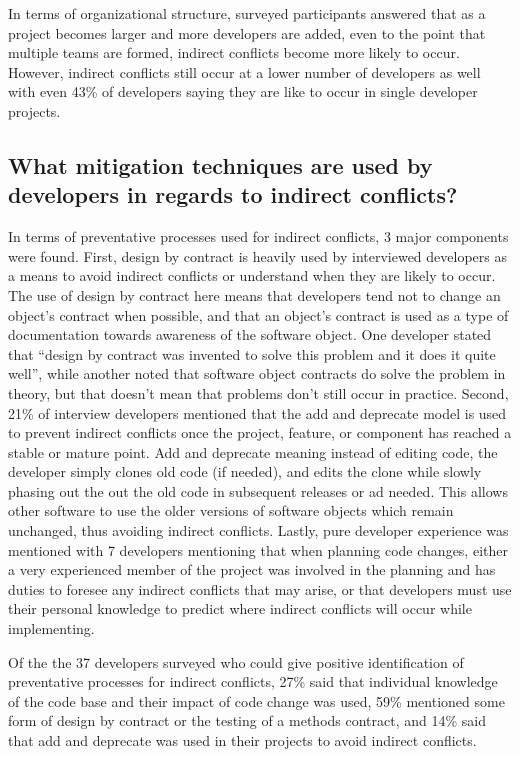\documentclass[conference]{IEEEtran}
\begin{document}
In terms of organizational structure, surveyed participants answered that as a project becomes larger and more 
developers are added, even to the point that multiple teams are formed, indirect conflicts become more likely to
occur. However, indirect conflicts still occur at a lower number of developers as well with even 43\% of developers
saying they are like to occur in single developer projects.

\subsection{What mitigation techniques are used by developers in regards to indirect conflicts?}

In terms of preventative processes used for indirect conflicts, 3 major components were found.
First, design by contract is heavily used by interviewed developers as a means to avoid indirect conflicts or understand
when they are likely to occur. The use of design by contract here means that developers tend not to change an object's
contract when possible, and that an object's contract is used as a type of documentation towards awareness of the 
software object. One developer stated that ``design by contract was invented to solve this problem and it does it 
quite well'', while another noted that software object contracts do solve the problem in theory, but that doesn't 
mean that problems don't still occur in practice.
Second, 21\% of interview developers mentioned that the add and deprecate 
model is used to prevent indirect conflicts once
the project, feature, or component has reached a stable or mature point.
Add and deprecate meaning instead of editing code, the developer simply clones old code (if needed), and edits the clone
while slowly phasing out the out the old code in subsequent releases or ad needed. This allows other software to 
use the older versions of software objects which remain unchanged, thus avoiding indirect conflicts.
Lastly, pure developer experience was mentioned with 7 developers mentioning that when planning code changes, 
either a very experienced member of the project was involved in the planning and has duties to foresee any 
indirect conflicts that may arise, or that developers must use their personal knowledge to predict where indirect 
conflicts will occur while implementing.

Of the the 37 developers surveyed who could give positive identification of preventative processes for indirect conflicts,
27\% said that individual knowledge of the code base and their impact of code change was used, 59\% mentioned some form of design
by contract or the testing of a methods contract, and 14\% said that add and
deprecate was used in their projects to avoid indirect conflicts.
\end{document}
